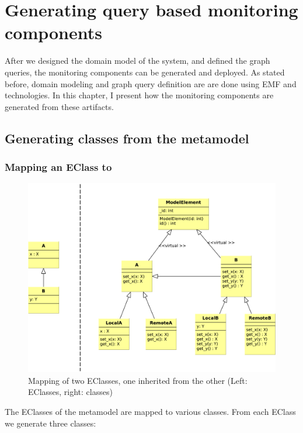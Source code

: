 \chapter{Generating query based monitoring components}

After we designed the domain model of the system, and defined the graph queries, the monitoring components can be generated and deployed.
As stated before, domain modeling and graph query definition are are done using EMF and \viatra{} technologies.
In this chapter, I present how the monitoring components are generated from these artifacts. 

\section{Generating classes from the metamodel}

\subsection{Mapping an EClass to \protect\cpp }


\begin{figure}
	\begin{center}
		\includegraphics[width=\textwidth]{figures/eclass-to-cpp.pdf}
		\caption{Mapping of two EClasses, one inherited from the other (Left: EClasses, right: \protect\cpp{} classes) }
		\label{fig:eclass-to-cpp}
	\end{center}
\end{figure}


The EClasses of the metamodel are mapped to various \cpp{} classes.
From each EClass we generate three \cpp{} classes:

